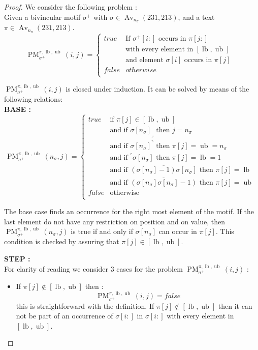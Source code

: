 \documentclass[a4paper]{llncs}
\DeclareMathOperator{\Avd}{Av}
\newcommand\Av[2]{\Avd_{{#1}}({#2})}
\newcommand{\ptext}{\pi}
\newcommand{\pmotif}{\sigma}
\newcommand{\pbmotif}{\pmotif^+}
\DeclareMathOperator{\PMa}{PM}
\newcommand{\PM}[6]{\PMa_{{#1}}^{{#2},{#3},{#4}}({#5},{#6})}
\DeclareMathOperator{\lb}{lb}
\DeclareMathOperator{\ub}{ub}
\begin{document}
\begin{proof}
We consider the following problem :\\
Given a bivincular motif $\pbmotif$ with $\pmotif \in \Av{n_\pmotif}{231,213} $, and a text $\ptext \in \Av{n_\ptext}{231,213}$.
$$
\PM{\pbmotif}{\ptext}{\lb}{\ub}{i}{j}=
\begin{cases}
	true 	& \text{If $\pbmotif[i:]$ occurs in $\ptext[j:]$}\\
			& \text{with every element in $[\lb,\ub]$}\\
			& \text{and element $\pmotif[i]$ occurs in $\ptext[j]$ }\\
	false 	& otherwise\\
\end{cases}
$$

$\PM{\pbmotif}{\ptext}{\lb}{\ub}{i}{j}$ is closed under induction.
It can be solved by means of the following relations:\\
\textbf{BASE :} \\
$$
\PM{\pbmotif}{\ptext}{\lb}{\ub}{n_\pmotif}{j}=
\begin{cases}
	true 	& \text{if $\ptext[j] \in [\lb,\ub ]$}\\
			& \text{and if ${\pmotif[n_\pmotif]}_\lrcorner$ then $j=n_\ptext$}\\
			& \text{and if ${\pmotif[n_\pmotif]}^\urcorner$ then $\ptext[j]=\ub=n_\pmotif$}\\
			& \text{and if  $^\ulcorner{\pmotif[n_\pmotif]}$ then $\ptext[j]=\lb=1$ } \\
			& \text{and if  $\overline{(\pmotif[n_\pmotif]-1)\pmotif[n_\pmotif] }$ then $\ptext[j]=\lb$ }  \\
			& \text{and if  $\overline{(\pmotif[n_\pmotif]\pmotif[n_\pmotif]-1)}$ then $\ptext[j]=\ub$}  \\
		
	false	& \text{otherwise} \\
\end{cases}
$$

The base case finds an occurrence for the right most element of the motif. If the last element do not have any restriction on position and on value, then $\PM{\pbmotif}{\ptext}{\lb}{\ub}{n_\pmotif}{j}$ is true if and only if $\pmotif[n_\pmotif]$ can occur in $\ptext[j]$. This condition is checked by assuring that $\ptext[j] \in [\lb,\ub]$. 

\textbf{STEP :} \\
For clarity of reading we consider 3 cases for the problem $\PM{\pbmotif}{\ptext}{\lb}{\ub}{i}{j}$ :
\begin{itemize}
	\item If $\ptext[j] \notin [\lb,\ub]$ then :
	$$
	\PM{\pbmotif}{\ptext}{\lb}{\ub}{i}{j} = false
	$$
	this is straightforward with the definition. If $\ptext[j] \notin [\lb,\ub]$ then it can not be part of an occurrence of  $\pmotif[i:]$ in $\pmotif[i:]$ with every element in $[\lb,\ub]$.
	

\end{itemize}
\end{proof}
\end{document}
